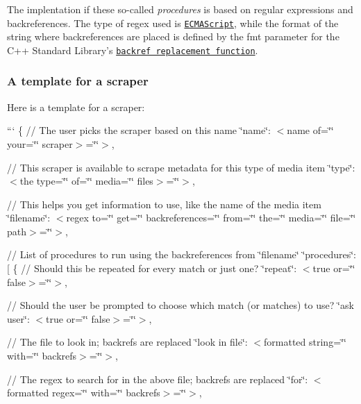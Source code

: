 The implentation if these so-\/called {\itshape procedures} is based on regular expressions and backreferences. The type of regex used is \href{http://www.cplusplus.com/reference/regex/ECMAScript/}{\tt E\-C\-M\-A\-Script}, while the format of the string where backreferences are placed is defined by the {\ttfamily fmt} parameter for the C++ Standard Library's \href{http://www.cplusplus.com/reference/regex/match_replace/}{\tt backref replacement function}.

\subsubsection*{A template for a scraper}

Here is a template for a scraper\-:

``` \{ // The user picks the scraper based on this name \char`\"{}name\char`\"{}\-: $<$name of=\char`\"{}\char`\"{} your=\char`\"{}\char`\"{} scraper$>$=\char`\"{}\char`\"{}$>$,

// This scraper is available to scrape metadata for this type of media item \char`\"{}type\char`\"{}\-: $<$the type=\char`\"{}\char`\"{} of=\char`\"{}\char`\"{} media=\char`\"{}\char`\"{} files$>$=\char`\"{}\char`\"{}$>$,

// This helps you get information to use, like the name of the media item \char`\"{}filename\char`\"{}\-: $<$regex to=\char`\"{}\char`\"{} get=\char`\"{}\char`\"{} backreferences=\char`\"{}\char`\"{} from=\char`\"{}\char`\"{} the=\char`\"{}\char`\"{} media=\char`\"{}\char`\"{} file=\char`\"{}\char`\"{} path$>$=\char`\"{}\char`\"{}$>$,

// List of procedures to run using the backreferences from \char`\"{}filename\char`\"{} \char`\"{}procedures\char`\"{}\-: \mbox{[} \{ // Should this be repeated for every match or just one? \char`\"{}repeat\char`\"{}\-: $<$true or=\char`\"{}\char`\"{} false$>$=\char`\"{}\char`\"{}$>$,

// Should the user be prompted to choose which match (or matches) to use? \char`\"{}ask user\char`\"{}\-: $<$true or=\char`\"{}\char`\"{} false$>$=\char`\"{}\char`\"{}$>$,

// The file to look in; backrefs are replaced \char`\"{}look in file\char`\"{}\-: $<$formatted string=\char`\"{}\char`\"{} with=\char`\"{}\char`\"{} backrefs$>$=\char`\"{}\char`\"{}$>$,

// The regex to search for in the above file; backrefs are replaced \char`\"{}for\char`\"{}\-: $<$formatted regex=\char`\"{}\char`\"{} with=\char`\"{}\char`\"{} backrefs$>$=\char`\"{}\char`\"{}$>$,

